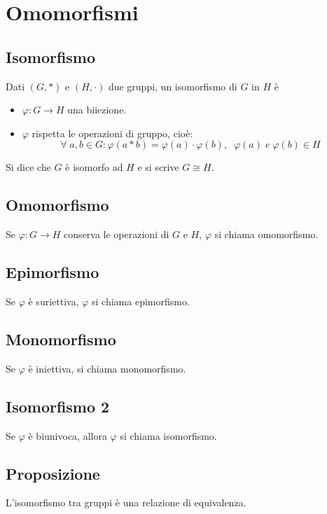 \section{Omomorfismi}

\subsection{Isomorfismo}
Dati \((G,*)\) e \((H,\cdot)\) due gruppi, un isomorfismo di \(G\) in \(H\) è
\begin{itemize}
	\item \(\varphi :G\rightarrow H\) una biiezione.
	\item \(\varphi\) rispetta le operazioni di gruppo, cioè:
	\[\forall\; a,b \in G: \varphi (a*b)=\varphi(a)\cdot\varphi (b),\;\; \varphi(a)\;e\;\varphi (b)\in H\]
\end{itemize}
Si dice che \(G\) è isomorfo ad \(H\) e si scrive \(G\cong H\).

\subsection{Omomorfismo}
Se \(\varphi :G\rightarrow H\) conserva le operazioni di \(G\) e \(H\), \(\varphi\) si chiama omomorfismo.

\subsection{Epimorfismo}
Se \(\varphi\) è suriettiva, \(\varphi\) si chiama epimorfismo.

\subsection{Monomorfismo}
Se \(\varphi\) è iniettiva, si chiama monomorfismo.

\subsection{Isomorfismo 2}
Se \(\varphi\) è biunivoca, allora \(\varphi\) si chiama isomorfismo.

\subsection{Proposizione}
L'isomorfismo tra gruppi è una relazione di equivalenza.